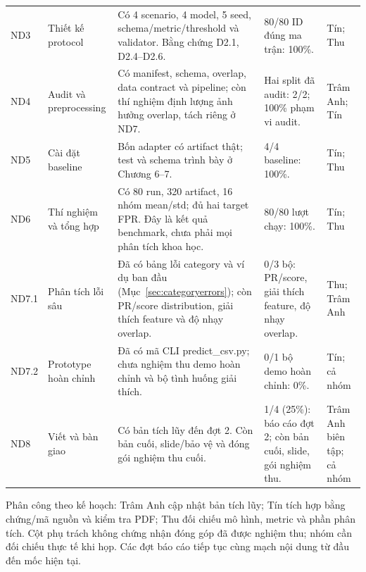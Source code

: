 \documentclass[12pt,a4paper,oneside]{report}
\begin{document}
\begin{longtable}{L{1.1cm}L{3.0cm}L{6.2cm}L{3.2cm}L{2.1cm}}
ND3 & Thiết kế protocol & Có 4 scenario, 4 model, 5 seed, schema/metric/threshold và validator. Bằng chứng D2.1, D2.4--D2.6. & 80/80 ID đúng ma trận: 100\%. & Tín; Thu\\
ND4 & Audit và preprocessing & Có manifest, schema, overlap, data contract và pipeline; còn thí nghiệm định lượng ảnh hưởng overlap, tách riêng ở ND7. & Hai split đã audit: 2/2; 100\% phạm vi audit. & Trâm Anh; Tín\\
ND5 & Cài đặt baseline & Bốn adapter có artifact thật; test và schema trình bày ở Chương 6--7. & 4/4 baseline: 100\%. & Tín; Thu\\
ND6 & Thí nghiệm và tổng hợp & Có 80 run, 320 artifact, 16 nhóm mean/std; đủ hai target FPR. Đây là kết quả benchmark, chưa phải mọi phân tích khoa học. & 80/80 lượt chạy: 100\%. & Tín; Thu\\
ND7.1 & Phân tích lỗi sâu & Đã có bảng lỗi category và ví dụ ban đầu (Mục~\ref{sec:categoryerrors}); còn PR/score distribution, giải thích feature và độ nhạy overlap. & 0/3 bộ: PR/score, giải thích feature, độ nhạy overlap. & Thu; Trâm Anh\\
ND7.2 & Prototype hoàn chỉnh & Đã có mã CLI predict\_csv.py; chưa nghiệm thu demo hoàn chỉnh và bộ tình huống giải thích. & 0/1 bộ demo hoàn chỉnh: 0\%. & Tín; cả nhóm\\
ND8 & Viết và bàn giao & Có bản tích lũy đến đợt 2. Còn bản cuối, slide/bảo vệ và đóng gói nghiệm thu cuối. & 1/4 (25\%): báo cáo đợt 2; còn bản cuối, slide, gói nghiệm thu. & Trâm Anh biên tập; cả nhóm\\
\bottomrule\end{longtable}\endgroup

Phân công theo kế hoạch: Trâm Anh cập nhật bản tích lũy; Tín tích hợp bằng chứng/mã nguồn và kiểm tra PDF; Thu đối chiếu mô hình, metric và phần phân tích. Cột phụ trách không chứng nhận đóng góp đã được nghiệm thu; nhóm cần đối chiếu thực tế khi họp. Các đợt báo cáo tiếp tục cùng mạch nội dung từ đầu đến mốc hiện tại.
\end{document}

